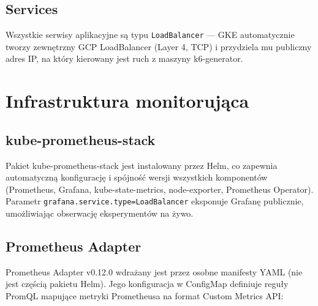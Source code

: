 





\subsection{Services}

Wszystkie serwisy aplikacyjne są typu \texttt{LoadBalancer} --- GKE automatycznie tworzy zewnętrzny GCP LoadBalancer (Layer 4, TCP) i przydziela mu publiczny adres IP, na który kierowany jest ruch z maszyny k6-generator.

\section{Infrastruktura monitorująca}

\subsection{kube-prometheus-stack}

Pakiet kube-prometheus-stack jest instalowany przez Helm, co zapewnia automatyczną konfigurację i spójność wersji wszystkich komponentów (Prometheus, Grafana, kube-state-metrics, node-exporter, Prometheus Operator). Parametr \texttt{grafana.service.type=LoadBalancer} eksponuje Grafanę publicznie, umożliwiając obserwację eksperymentów na żywo.

\subsection{Prometheus Adapter}

Prometheus Adapter v0.12.0 wdrażany jest przez osobne manifesty YAML (nie jest częścią pakietu Helm). Jego konfiguracja w ConfigMap definiuje reguły PromQL mapujące metryki Prometheusa na format Custom Metrics API:



